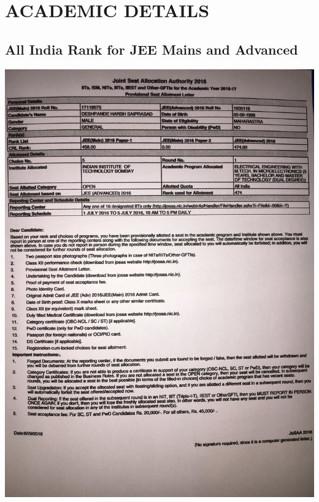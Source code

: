 \documentclass{article}
\begin{document}
	\section{ACADEMIC DETAILS}
		\subsection{All India Rank for JEE Mains and Advanced }
	\includegraphics[width = 1\textwidth]{Acads/jee-main-and-advanced.jpg}{\centering}
\end{document}
